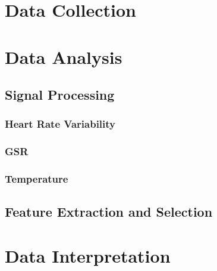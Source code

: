 \section{Data Collection}
\section{Data Analysis}
\subsection{Signal Processing}
\subsubsection{Heart Rate Variability}

\subsubsection{GSR}

\subsubsection{Temperature}
\subsection{Feature Extraction and Selection}
\section{Data Interpretation}

